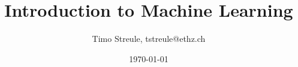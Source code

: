 \documentclass[%
    ,a4paper
    ,fontsize=9.5pt
    ,landscape
    ,pagesize
    ,headinclude
    ]{scrartcl}
\title{Introduction to Machine Learning}
\author{Timo Streule, tstreule@ethz.ch}
\date{\today}
\begin{document}
    

    \begin{multicols*}{4}


        \maketitle

        
        
        
        
        
        
        
        
        
        
        
        
        
        

    \end{multicols*}
\end{document}
